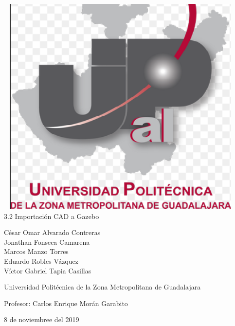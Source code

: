 \documentclass[11pt,a4paper,oldfontcommands,oneside]{memoir}
\begin{document}
%
%
\thispagestyle{empty}

{%
\sffamily
\centering
\Large

~\vspace{\fill}
\includegraphics[scale=0.5]{marcos.png} \\
{\huge 
\vspace{2cm}
3.2 Importación CAD a Gazebo
}
\vspace{2.5cm}

{\LARGE
César Omar Alvarado Contreras \\
Jonathan Fonseca Camarena \\
Marcos Manzo Torres \\
Eduardo Robles Vázquez \\
Víctor Gabriel Tapia Casillas

}

\vspace{2.5cm}

Universidad Politécnica de la Zona Metropolitana de Guadalajara

\vspace{3.5cm}

Profesor: Carlos Enrique Morán Garabito

\vspace{\fill}

8 de noviembree del 2019

}%
\end{document}
